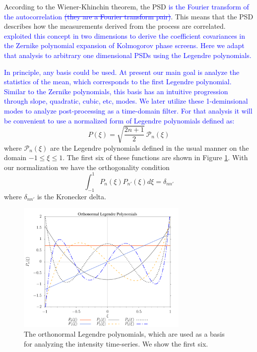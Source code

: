 \documentclass[10pt,preprint]{aastex631}
\newcommand{\jrmadd}[1]{\textcolor{blue}{#1}}
\newcommand{\jrmrmv}[1]{\textcolor{blue}{\sout{#1}}}
\begin{document}
According to the Wiener-Khinchin theorem, the PSD \jrmadd{is the Fourier transform of the autocorrelation} \jrmrmv{(they are a Fourier transform pair)}.  This means that the PSD describes how the measurements derived from the process are correlated. \jrmadd{\citet{1976JOSA...66..207N} exploited this concept in two dimensions to derive the coefficient covariances in the Zernike polynomial expansion of Kolmogorov phase screens.  Here we adapt that analysis to arbitrary one dimensional PSDs using the Legendre polynomials.}  

\jrmadd{In principle, any basis could be used.  At present our main goal is analyze the statistics of the mean, which corresponds to the first Legendre polynomial.  Similar to the Zernike polynomials, this basis has an intuitive progression through slope, quadratic, cubic, etc, modes. We later utilize these 1-deminsional modes to analyze post-processing as a time-domain filter.  For that analysis it will be convenient to use a normalized form of Legendre polynomials defined as:}
\begin{equation}
P(\xi) = \sqrt{\frac{2n+1}{2}}\, \mathscr{P}_n(\xi)
\label{eqn:basis}
\end{equation}
where $\mathscr{P}_n(\xi)$ are the Legendre polynomials defined in the usual manner \citep[cf.][]{Olver:2010:NHMF} on the domain $-1 \le \xi \le 1$. The first six of these functions are shown in Figure \ref{fig:onlegpol}.  With our normalization we have the orthogonality condition
\begin{equation}
\int_{-1}^{1}P_n(\xi)P_{n'}(\xi) d\xi = \delta_{nn'}
\label{eqn:orthonormal}
\end{equation}
where $\delta_{nn'}$ is the Kronecker delta. 

\begin{figure}[h]
\centering
\includegraphics[width=3.25in]{onLegPol.pdf}
\caption{The orthonormal Legendre polynomials, which are used as a basis for analyzing the intensity time-series.  We show the first six. \label{fig:onlegpol}}
\end{figure}
\end{document}

